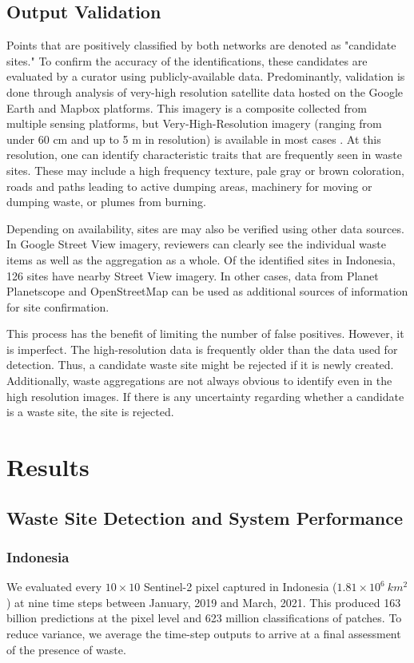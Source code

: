 \documentclass[10pt,letterpaper]{article}
\begin{document}
\subsection*{Output Validation} 
\label{sec:validation}
Points that are positively classified by both networks are denoted as "candidate sites." To confirm the accuracy of the identifications, these candidates are evaluated by a curator using publicly-available data. Predominantly, validation is done through analysis of very-high resolution satellite data hosted on the Google Earth and Mapbox platforms. This imagery is a composite collected from multiple sensing platforms, but Very-High-Resolution imagery (ranging from under 60 cm and up to 5 m in resolution) is available in most cases \cite{lesiv2018characterizing}. At this resolution, one can identify characteristic traits that are frequently seen in waste sites. These may include a high frequency texture, pale gray or brown coloration, roads and paths leading to active dumping areas, machinery for moving or dumping waste, or plumes from burning.

Depending on availability, sites are may also be verified using other data sources. In Google Street View imagery, reviewers can clearly see the individual waste items as well as the aggregation as a whole. Of the identified sites in Indonesia, 126 sites have nearby Street View imagery. In other cases, data from Planet Planetscope and OpenStreetMap can be used as additional sources of information for site confirmation.

This process has the benefit of limiting the number of false positives. However, it is imperfect. The high-resolution data is frequently older than the data used for detection. Thus, a candidate waste site might be rejected if it is newly created. Additionally, waste aggregations are not always obvious to identify even in the high resolution images. If there is any uncertainty regarding whether a candidate is a waste site, the site is rejected.

\section*{Results}
\label{sec:results}
\subsection*{Waste Site Detection and System Performance}
\subsubsection*{Indonesia}
We evaluated every $10\times10 $ Sentinel-2 pixel captured in Indonesia ($1.81\times10^6\:km^2$) at nine time steps between January, 2019 and March, 2021. This produced 163 billion predictions at the pixel level and 623 million classifications of patches. To reduce variance, we average the time-step outputs to arrive at a final assessment of the presence of waste.
\end{document}
